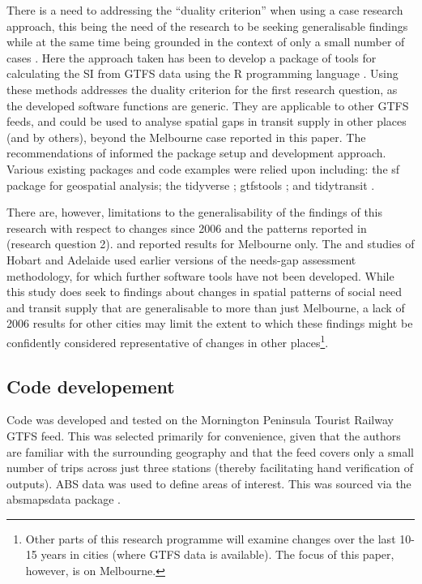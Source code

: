 \documentclass[preprint, 3p,
authoryear]{elsarticle} %
\begin{document}
There is a need to addressing the ``duality criterion'' when using a
case research approach, this being the need of the research to be
seeking generalisable findings while at the same time being grounded in
the context of only a small number of cases
\citep{Denscombe2007aa, Ketokivi2014aa}. Here the approach taken has
been to develop a package of tools for calculating the SI from GTFS data
using the R programming language \citep{R-base}. Using these methods
addresses the duality criterion for the first research question, as the
developed software functions are generic. They are applicable to other
GTFS feeds, and could be used to analyse spatial gaps in transit supply
in other places (and by others), beyond the Melbourne case reported in
this paper. The recommendations of \citet{wickham2023r} informed the
package setup and development approach. Various existing packages and
code examples were relied upon including: the sf package \citep{R-sf}
for geospatial analysis; the tidyverse \citep{tidyverse2019}; gtfstools
\citep{R-gtfstools}; and tidytransit \citep{R-tidytransit}.

There are, however, limitations to the generalisability of the findings
of this research with respect to changes since 2006 and the patterns
reported in \citet{currie2010identifying}(research question 2).
\citet{Currie2007Identifying} and \citet{currie2010identifying} reported
results for Melbourne only. The \citet{Currie2003Hobart} and
\citet{Currie2004Gap} studies of Hobart and Adelaide used earlier
versions of the needs-gap assessment methodology, for which further
software tools have not been developed. While this study does seek to
findings about changes in spatial patterns of social need and transit
supply that are generalisable to more than just Melbourne, a lack of
2006 results for other cities may limit the extent to which these
findings might be confidently considered representative of changes in
other places\footnote{Other parts of this research programme will
  examine changes over the last 10-15 years in cities (where GTFS data
  is available). The focus of this paper, however, is on Melbourne.}.

\hypertarget{code-developement}{%
\subsection{Code developement}\label{code-developement}}

Code was developed and tested on the Mornington Peninsula Tourist
Railway GTFS feed. This was selected primarily for convenience, given
that the authors are familiar with the surrounding geography and that
the feed covers only a small number of trips across just three stations
(thereby facilitating hand verification of outputs). ABS data was used
to define areas of interest. This was sourced via the absmapsdata
package \citep{absmapsdata}.
\end{document}
